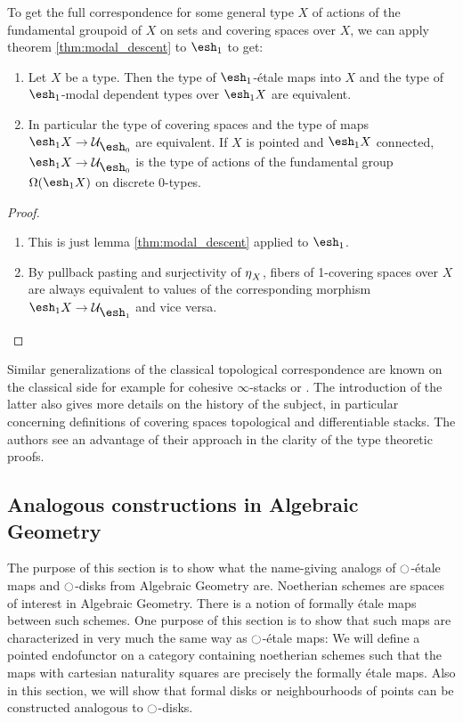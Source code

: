 \documentclass[9pt,twosided]{amsart}
\newcommand{\shape}{\ensuremath{\mathord{\raisebox{0.5pt}{\text{\rm\esh}}}}}
\begin{document}
To get the full correspondence for some general type $X$ of actions of the fundamental groupoid of $X$ on sets and covering spaces over $X$,
we can apply theorem \ref{thm:modal_descent} to $\shape_1$ to get:

\begin{thm}
  \begin{enumerate}
  \item Let $X$ be a type. Then the type of $\shape_1$-étale maps into $X$ and the type of $\shape_1$-modal dependent types over $\shape_1 X$ are equivalent.
  \item In particular the type of covering spaces and the type of maps $\shape_1X\to \mathcal U_{\shape_0}$ are equivalent.
    If $X$ is pointed and $\shape_1 X$ connected, $\shape_1X\to \mathcal U_{\shape_0}$ is the type of actions of the fundamental group $\Omega(\shape_1 X)$ on discrete 0-types.
  \end{enumerate}
\end{thm}
\begin{proof}
  \begin{enumerate}
  \item This is just lemma \ref{thm:modal_descent} applied to $\shape_1$.
  \item By pullback pasting and surjectivity of ${\eta_{}}_X$, fibers of 1-covering spaces over $X$ are always equivalent to values of the corresponding morphism $\shape_1 X\to \mathcal U_{\shape_1}$ and vice versa.
  \end{enumerate}
\end{proof}

Similar generalizations of the classical topological correspondence are known on the classical side
for example for cohesive $\infty$-stacks \cite[Section 5.2.7]{SchreiberDcct} or \cite{dmr-2covers}.
The introduction of the latter also gives more details on the history of the subject,
in particular concerning definitions of covering spaces topological and differentiable stacks.
The authors see an advantage of their approach in the clarity of the type theoretic proofs.

\subsection{Analogous constructions in Algebraic Geometry}
\label{subsection:algebraic geometry}
The purpose of this section is to show what the name-giving analogs of ${\ocircle}$-étale maps and ${\ocircle}$-disks from Algebraic Geometry are.
Noetherian schemes are spaces of interest in Algebraic Geometry. There is a notion of formally étale maps between such schemes.
One purpose of this section is to show that such maps are characterized in very much the same way as ${\ocircle}$-étale maps:
We will define a pointed endofunctor on a category containing noetherian schemes
such that the maps with cartesian naturality squares are precisely the formally étale maps.
Also in this section, we will show that formal disks or neighbourhoods of points can be constructed analogous to ${\ocircle}$-disks.
\end{document}
